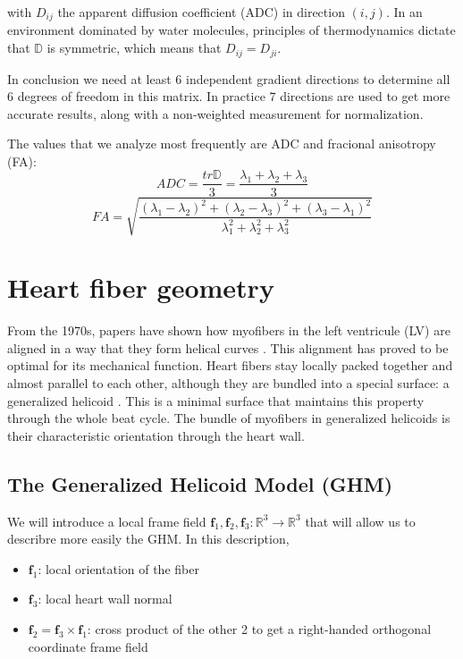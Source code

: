 with $D_{ij}$ the apparent diffusion coefficient (ADC) in direction $(i, j)$. In an environment dominated by water molecules, principles of thermodynamics dictate that $\mathbb{D}$ is symmetric, which means that $D_{ij} = D_{ji}$.

In conclusion we need at least 6 independent gradient directions to determine all 6 degrees of freedom in this matrix. In practice 7 directions are used to get more accurate results, along with a non-weighted measurement for normalization.

The values that we analyze most frequently are ADC and fracional anisotropy (FA):
\begin{equation}
    ADC = \frac{tr{\mathbb{D}}}{3} = \frac{\lambda_1 + \lambda_2 + \lambda_3}{3}
\end{equation}
\begin{equation}
    FA = \sqrt{\frac{(\lambda_1 - \lambda_2)^2 + (\lambda_2 - \lambda_3)^2 + (\lambda_3 - \lambda_1)^2}{\lambda_1^2 + \lambda_2^2 + \lambda_3^2}}
\end{equation}

\section{Heart fiber geometry}

From the 1970s, papers have shown how myofibers in the left ventricule (LV) are aligned in a way that they form helical curves \cite{savadjiev2012heart}. This alignment has proved to be optimal for its mechanical function. Heart fibers stay locally packed together and almost parallel to each other, although they are bundled into a special surface: a generalized helicoid \cite{blair1978generalization}. This is a minimal surface that maintains this property through the whole beat cycle. The bundle of myofibers in generalized helicoids is their characteristic orientation through the heart wall.

\subsection{The Generalized Helicoid Model (GHM)}

We will introduce a local frame field $\mathbf{f}_1,\mathbf{f}_2,\mathbf{f}_3 : \mathbb{R}^3 \to \mathbb{R}^3$ that will allow us to describre more easily the GHM. In this description,
\begin{itemize}
    \item $\mathbf{f}_1$: local orientation of the fiber
    \item $\mathbf{f}_3$: local heart wall normal
    \item $\mathbf{f}_2 = \mathbf{f}_3 \times \mathbf{f}_1$: cross product of the other 2 to get a right-handed orthogonal coordinate frame field
\end{itemize}

